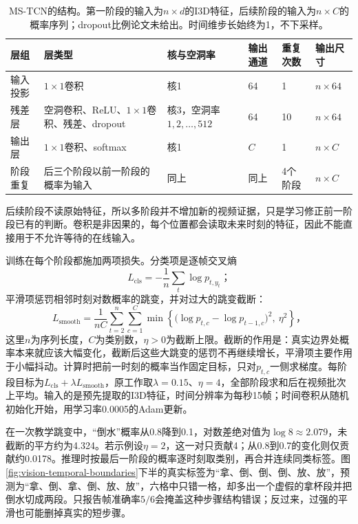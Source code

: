 \begin{table}[htbp]
  \centering
  \small
  \begin{tabularx}{\linewidth}{@{}lXXlll@{}}
    \toprule
    层组 & 层类型 & 核与空洞率 & 输出通道 & 重复次数 & 输出尺寸\\
    \midrule
    输入投影 & $1\times1$卷积 & 核1 & 64 & 1 & $n\times64$\\
    残差层 & 空洞卷积、ReLU、$1\times1$卷积、残差、dropout & 核3，空洞率$1,2,\ldots,512$ & 64 & 10 & $n\times64$\\
    输出层 & $1\times1$卷积、softmax & 核1 & $C$ & 1 & $n\times C$\\
    阶段重复 & 后三个阶段以前一阶段的概率为输入 & 同上 & 同上 & 4个阶段 & $n\times C$\\
    \bottomrule
  \end{tabularx}
  \caption{MS-TCN的结构。第一阶段的输入为$n\times d$的I3D特征，后续阶段的输入为$n\times C$的概率序列；dropout比例论文未给出。时间维步长始终为1，不下采样。}
  \label{tab:vision-video-mstcn-arch}
\end{table}后续阶段不读原始特征，所以多阶段并不增加新的视频证据，只是学习修正前一阶段已有的判断。卷积是非因果的，每个位置都会读取未来时刻的特征，因此不能直接用于不允许等待的在线输入。

训练在每个阶段都施加两项损失。分类项是逐帧交叉熵
\[
 L_{\mathrm{cls}}=-\frac{1}{n}\sum_t\log p_{t,y_t}\text{；}
\]
平滑项惩罚相邻时刻对数概率的跳变，并对过大的跳变截断：
\begin{equation}
  L_{\mathrm{smooth}}
  =\frac{1}{nC}\sum_{t=2}^{n}\sum_{c=1}^{C}
  \min\!\left\{
  \bigl(\log p_{t,c}-\log p_{t-1,c}\bigr)^2,\ \eta^2
  \right\}\text{，}
  \label{eq:vision-video-smoothing}
\end{equation}
这里$n$为序列长度，$C$为类别数，$\eta>0$为截断上限。截断的作用是：真实边界处概率本来就应该大幅变化，截断后这些大跳变的惩罚不再继续增长，平滑项主要作用于小幅抖动。计算时把前一时刻的概率当作固定目标，只对$p_{t,c}$一侧求梯度。每阶段目标为$L_{\mathrm{cls}}+\lambda L_{\mathrm{smooth}}$，原工作取$\lambda=0.15$、$\eta=4$，全部阶段求和后在视频批次上平均。输入的是预先提取的I3D特征，时间分辨率为每秒15帧；时间卷积从随机初始化开始，用学习率0.0005的Adam更新。

在一次教学跳变中，“倒水”概率从0.8降到0.1，对数差绝对值为$\log 8\approx2.079$，未截断的平方约为4.324。若示例设$\eta=2$，这一对只贡献4；从0.8到0.7的变化则仅贡献约0.0178。推理时按最后一阶段的概率逐时刻取类别，再合并连续同类标签。图\ref{fig:vision-temporal-boundaries}下半的真实标签为“拿、倒、倒、倒、放、放”，预测为“拿、倒、拿、倒、放、放”，六格中只错一格，却多出一个虚假的拿杯段并把倒水切成两段。只报告帧准确率$5/6$会掩盖这种步骤结构错误；反过来，过强的平滑也可能删掉真实的短步骤。

